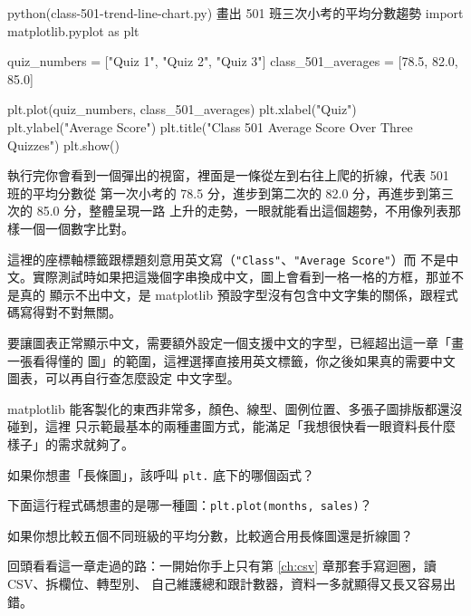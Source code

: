 \begin{example}{python}{(class-501-trend-line-chart.py) 畫出 501 班三次小考的平均分數趨勢}
import matplotlib.pyplot as plt

quiz_numbers = ["Quiz 1", "Quiz 2", "Quiz 3"]
class_501_averages = [78.5, 82.0, 85.0]

plt.plot(quiz_numbers, class_501_averages)
plt.xlabel("Quiz")
plt.ylabel("Average Score")
plt.title("Class 501 Average Score Over Three Quizzes")
plt.show()
\end{example}

執行完你會看到一個彈出的視窗，裡面是一條從左到右往上爬的折線，代表 501 班的平均分數從
第一次小考的 78.5 分，進步到第二次的 82.0 分，再進步到第三次的 85.0 分，整體呈現一路
上升的走勢，一眼就能看出這個趨勢，不用像列表那樣一個一個數字比對。


這裡的座標軸標籤跟標題刻意用英文寫（\texttt{"Class"}、\texttt{"Average Score"}）而
不是中文。實際測試時如果把這幾個字串換成中文，圖上會看到一格一格的方框，那並不是真的
顯示不出中文，是 matplotlib 預設字型沒有包含中文字集的關係，跟程式碼寫得對不對無關。

要讓圖表正常顯示中文，需要額外設定一個支援中文的字型，已經超出這一章「畫一張看得懂的
圖」的範圍，這裡選擇直接用英文標籤，你之後如果真的需要中文圖表，可以再自行查怎麼設定
中文字型。

matplotlib 能客製化的東西非常多，顏色、線型、圖例位置、多張子圖排版都還沒碰到，這裡
只示範最基本的兩種畫圖方式，能滿足「我想很快看一眼資料長什麼樣子」的需求就夠了。

\begin{drills}[label=drills:matplotlib-basic]
\item 如果你想畫「長條圖」，該呼叫 \texttt{plt.} 底下的哪個函式？
\item 下面這行程式碼想畫的是哪一種圖：\texttt{plt.plot(months, sales)}？
\item 如果你想比較五個不同班級的平均分數，比較適合用長條圖還是折線圖？
\end{drills}

回頭看看這一章走過的路：一開始你手上只有第 \ref{ch:csv} 章那套手寫迴圈，讀 CSV、拆欄位、轉型別、
自己維護總和跟計數器，資料一多就顯得又長又容易出錯。

